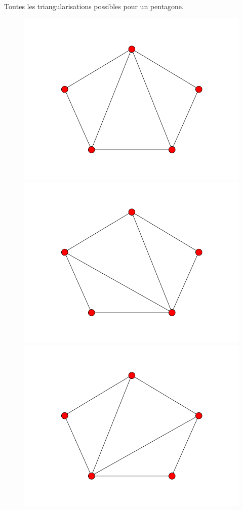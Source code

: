 \documentclass[fontsize=10pt]{article}
\begin{document}
\begin{enumerate}
Toutes les triangularisations possibles pour un pentagone.

\begin{figure}[hbtp]
\centering
\includegraphics[scale=0.1]{imgs/pentagon/pentagon_1.png}
\includegraphics[scale=0.1]{imgs/pentagon/pentagon_2.png}
\includegraphics[scale=0.1]{imgs/pentagon/pentagon_3.png}

\end{figure}
\end{enumerate}
\end{document}
